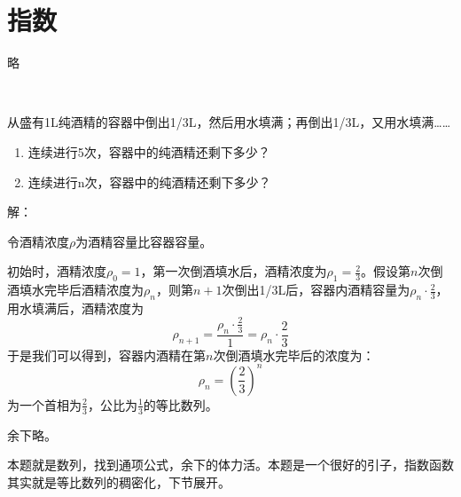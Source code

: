 \section{指数}

略

~

\begin{example}
从盛有1L纯酒精的容器中倒出1/3L，然后用水填满；再倒出1/3L，又用水填满……
\begin{enumerate}
    \item 连续进行5次，容器中的纯酒精还剩下多少？
    \item 连续进行n次，容器中的纯酒精还剩下多少？
\end{enumerate}
\end{example}

解：

令酒精浓度$\rho $为酒精容量比容器容量。

初始时，酒精浓度$\rho _0=1$，第一次倒酒填水后，酒精浓度为$\rho _1=\frac{2}{3}$。假设第$n$次倒酒填水完毕后酒精浓度为$\rho _n$，则第$n+1$次倒出1/3L后，容器内酒精容量为$\rho _n\cdot \frac{2}{3}$，用水填满后，酒精浓度为
\[
\rho _{n+1}=\frac{\rho _n\cdot \frac{2}{3}}{1}=\rho _n\cdot \frac{2}{3}
\]
于是我们可以得到，容器内酒精在第$n$次倒酒填水完毕后的浓度为：
\[
\rho _n=\left( \frac{2}{3} \right) ^n
\]
为一个首相为$\frac{2}{3}$，公比为$\frac{1}{3}$的等比数列。

余下略。

\begin{tcolorbox}
本题就是数列，找到通项公式，余下的体力活。本题是一个很好的引子，指数函数其实就是等比数列的稠密化，下节展开。
\end{tcolorbox}





